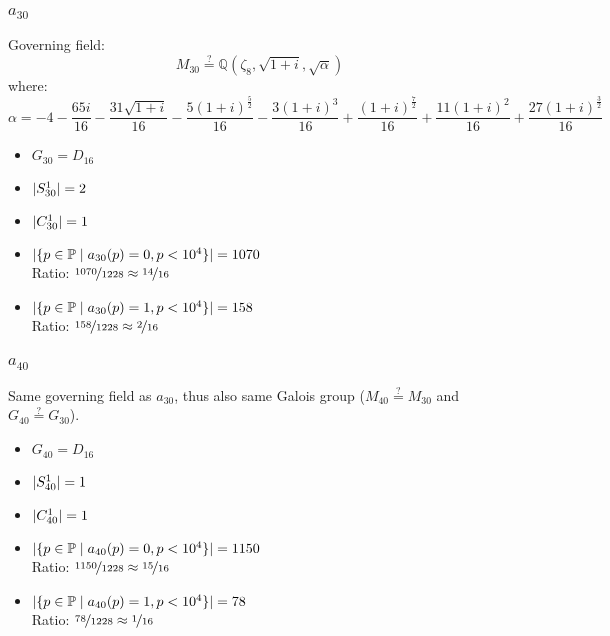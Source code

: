 \subsubsection{$a_{30}$}
Governing field:
$$M_{30} \stackrel{?}{=} \mathbb{Q}\left(\zeta_8, \sqrt{1+i}, \sqrt{\alpha}\right)$$
where:
$$\alpha = -4 - \frac{65 i}{16} - \frac{31 \sqrt{1 + i}}{16} - \frac{5 \left(1 + i\right)^{\frac{5}{2}}}{16} - \frac{3 \left(1 + i\right)^{3}}{16} + \frac{\left(1 + i\right)^{\frac{7}{2}}}{16} + \frac{11 \left(1 + i\right)^{2}}{16} + \frac{27 \left(1 + i\right)^{\frac{3}{2}}}{16}$$
\begin{multicols}{2}
	\begin{itemize}
		\item $G_{30} = D_{16}$
		\item $| S_{30}^1 | = 2$
		\item $| C_{30}^1 | = 1$
	\end{itemize}
	\begin{itemize}
		\item $| \{ p \in \mathbb{P} \mid a_{30}(p)=0, p<10^4 \} | = 1070$\\
		Ratio: $\nicefrac{ 1070 }{ 1228 } \approx \nicefrac{ 14 }{ 16 }$
		\item $| \{ p \in \mathbb{P} \mid a_{30}(p)=1, p<10^4 \} | = 158$\\
		Ratio: $\nicefrac{ 158 }{ 1228 } \approx \nicefrac{ 2 }{ 16 }$
	\end{itemize}
\end{multicols}

\subsubsection{$a_{40}$}
Same governing field as $a_{30}$, thus also same Galois group ($M_{40} \stackrel{?}{=} M_{30}$ and $G_{40} \stackrel{?}{=} G_{30}$).
\begin{multicols}{2}
	\begin{itemize}
		\item $G_{40} = D_{16}$
		\item $| S_{40}^1 | = 1$
		\item $| C_{40}^1 | = 1$
	\end{itemize}
	\begin{itemize}
		\item $| \{ p \in \mathbb{P} \mid a_{40}(p)=0, p<10^4 \} | = 1150$\\
		Ratio: $\nicefrac{ 1150 }{ 1228 } \approx \nicefrac{ 15 }{ 16 }$
		\item $| \{ p \in \mathbb{P} \mid a_{40}(p)=1, p<10^4 \} | = 78$\\
		Ratio: $\nicefrac{ 78 }{ 1228 } \approx \nicefrac{ 1 }{ 16 }$
	\end{itemize}
\end{multicols}

